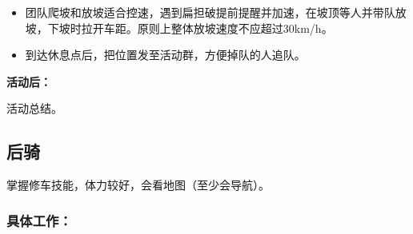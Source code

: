 \documentclass{ctexbook}
\begin{document}
\begin{itemize}
\item  团队爬坡和放坡适合控速，遇到扁担破提前提醒并加速，在坡顶等人并带队放坡，下坡时拉开车距。原则上整体放坡速度不应超过30km/h。
\item 到达休息点后，把位置发至活动群，方便掉队的人追队。
\end{itemize}
\textbf{活动后：}

活动总结。
 
\subsection{后骑}

掌握修车技能，体力较好，会看地图（至少会导航）。

\subsubsection{具体工作：}
\end{document}
